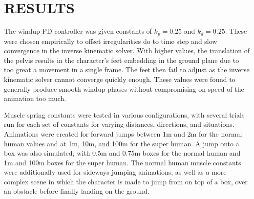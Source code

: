 
 
\chapter{RESULTS}
\label{chapter:results}
The windup PD controller was given constants of $k_p = 0.25$ and $k_d = 0.25$.  These were chosen empirically to offset irregularities do to time step and slow convergence in the inverse kinematic solver.  With higher values, the translation of the pelvis results in the character's feet embedding in the ground plane due to too great a movement in a single frame.  The feet then fail to adjust as the inverse kinematic solver cannot converge quickly enough.  These values were found to generally produce smooth windup phases without compromising on speed of the animation too much.

Muscle spring constants were tested in various configurations, with several trials run for each set of constants for varying distances, directions, and situations.  Animations were created for forward jumps between 1m and 2m for the normal human values and at 1m, 10m, and 100m for the super human.  A jump onto a box was also simulated, with 0.5m and 0.75m boxes for the normal human and 1m and 100m boxes for the super human.  The normal human muscle constants were additionally used for sideways jumping animations, as well as a more complex scene in which the character is made to jump from on top of a box, over an obstacle before finally landing on the ground.

